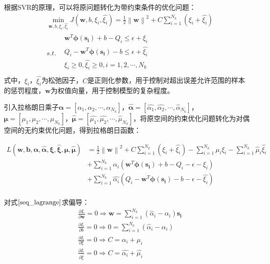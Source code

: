 根据SVR的原理，可以将原问题转化为带约束条件的优化问题：
\begin{equation}\label{seq_svr_ori}
\begin{split}
& \min_{\mathbf{w},b,\xi_{i},\hat{\xi_{i}}}  J(\mathbf{w},b,\xi_{i},\hat{\xi_{i}}) = \frac{1}{2} \left \| \mathbf{w} \right \|^{2} + C \sum_{i=1}^{N_{k}}(\xi_{i}+\hat{\xi_{i}})\\ 
& s.t. \begin{matrix}
&\mathbf{w}^{T} \bm{\phi(s_{i})} + b - Q_{i} \leqslant \epsilon + \xi_{i}\\
&Q_{i} - \mathbf{w}^{T} \bm{\phi(s_{i})} - b  \leqslant \epsilon + \hat{\xi_{i}} \\
&\xi_{i} \geqslant 0,\hat{\xi_{i}} \geqslant 0, i=1,2,\cdots,N_{k}\\
\end{matrix}
\end{split}
\end{equation}
式中，$\xi_{i}$，$\hat{\xi_{i}}$为松弛因子，$C$是正则化参数，用于控制对超出误差允许范围的样本的惩罚程度，$\mathbf{w}$为权值向量，用于控制模型的复杂程度。

引入拉格朗日乘子$\bm{\alpha}=[\alpha_{1},\alpha_{2},\cdots,\alpha_{N_{k}}]$，$\bm{\hat{\alpha}}=[\hat{\alpha_{1}},\hat{\alpha_{2}},\cdots,\hat{\alpha}_{N_{k}}]$，$\bm{\mu}=[\mu_{1},\mu_{2},\cdots,\mu_{N_{k}}]$，$\bm{\hat{\mu}}=[\hat{\mu_{1}},\hat{\mu_{2}},\cdots,\hat{\mu}_{N_{k}}]$，将原空间的约束优化问题转化为对偶空间的无约束优化问题，得到拉格朗日函数：

\begin{equation}\label{seq_lagrange}
\begin{aligned}
L(\mathbf{w}, \mathbf{b}, \bm{\alpha}, \bm{\hat{\alpha}}, \bm{\xi}, \bm{\hat{\xi}},
\bm{\mu},\bm{\hat{\mu}})&=\frac{1}{2} \left \| \mathbf{{w}} \right \|^{2} + C \sum_{i=1}^{N_{k}}(\xi_{i} + \hat{\xi_{i}}) - \sum_{i=1}^{N_{k}}\mu_{i}\xi_{i} - \sum_{i=1}^{N_{k}}\hat{\mu}_{i}\hat{\xi_{i}} \\ 
&+ \sum_{i=1}^{N_{k}} \alpha_{i}(\mathbf{w}^{T} \bm{\phi(s_{i})} + b - Q_{i} - \epsilon - \xi_{i}) \\
&+ \sum_{i=1}^{N_{k}} \hat{\alpha_{i}}(Q_{i} - \mathbf{w}^{T} \bm{\phi(s_{i})} - b - \epsilon - \hat{\xi_{i}})\\
\end{aligned}
\end{equation}

对式$\eqref{seq_lagrange}$求偏导：
\begin{equation}\label{seq_lag_deri}
\begin{split}
&\frac{\partial{L}}{\partial{\bm{w}}}=0 \Rightarrow \bm{w} = \sum_{i=1}^{N_{k}}(\hat{\alpha}_{i}-\alpha_{i})\bm{s_{i}}
\\ 
&\frac{\partial{L}}{\partial{b}}=0 \Rightarrow 0 = \sum_{i=1}^{N_{k}}(\hat{\alpha}_{i}-\alpha_{i})
\\ 
&\frac{\partial{L}}{\partial{\xi}}=0 \Rightarrow  C = \alpha_{i} + \mu_{i}
\\ 
&\frac{\partial{L}}{\partial{\hat{\xi}}}=0 \Rightarrow  C = \hat{\alpha_{i}} + \hat{\mu_{i}}
\\
\end{split}
\end{equation}

